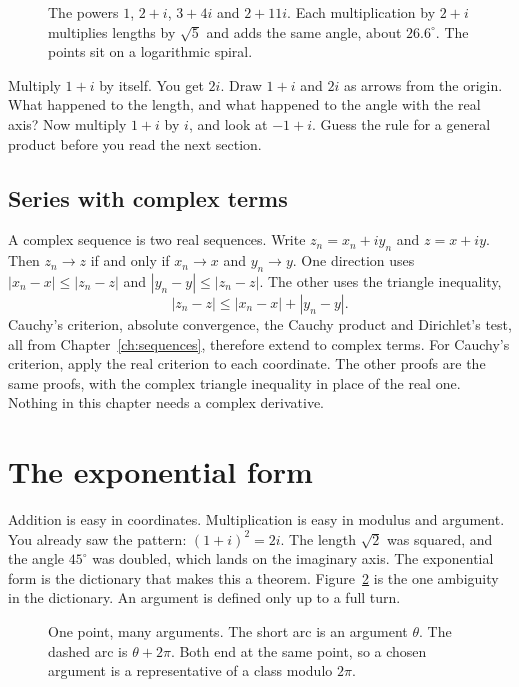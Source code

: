 \begin{figure}[ht]
\centering
{}
\caption{The powers $1$, $2+i$, $3+4i$ and $2+11i$. Each multiplication by $2+i$ multiplies lengths by $\sqrt5$ and adds the same angle, about $26.6^\circ$. The points sit on a logarithmic spiral.}
\label{fig:bombelli}
\end{figure}

\begin{think}
Multiply $1+i$ by itself. You get $2i$. Draw $1+i$ and $2i$ as arrows from the origin. What happened to the length, and what happened to the angle with the real axis? Now multiply $1+i$ by $i$, and look at $-1+i$. Guess the rule for a general product before you read the next section.
\end{think}

\subsection{Series with complex terms}
A complex sequence is two real sequences. Write $z_n=x_n+iy_n$ and $z=x+iy$. Then $z_n\to z$ if and only if $x_n\to x$ and $y_n\to y$. One direction uses $|x_n-x|\le|z_n-z|$ and $|y_n-y|\le|z_n-z|$. The other uses the triangle inequality,
\[
|z_n-z|\le|x_n-x|+|y_n-y|.
\]
Cauchy's criterion, absolute convergence, the Cauchy product and Dirichlet's test, all from Chapter~\ref{ch:sequences}, therefore extend to complex terms. For Cauchy's criterion, apply the real criterion to each coordinate. The other proofs are the same proofs, with the complex triangle inequality in place of the real one. Nothing in this chapter needs a complex derivative.

\section{The exponential form}

Addition is easy in coordinates. Multiplication is easy in modulus and argument. You already saw the pattern: $(1+i)^2=2i$. The length $\sqrt2$ was squared, and the angle $45^\circ$ was doubled, which lands on the imaginary axis. The exponential form is the dictionary that makes this a theorem. Figure~\ref{fig:arguments} is the one ambiguity in the dictionary. An argument is defined only up to a full turn.

\begin{figure}[ht]
\centering
{}
\caption{One point, many arguments. The short arc is an argument $\theta$. The dashed arc is $\theta+2\pi$. Both end at the same point, so a chosen argument is a representative of a class modulo $2\pi$.}
\label{fig:arguments}
\end{figure}

